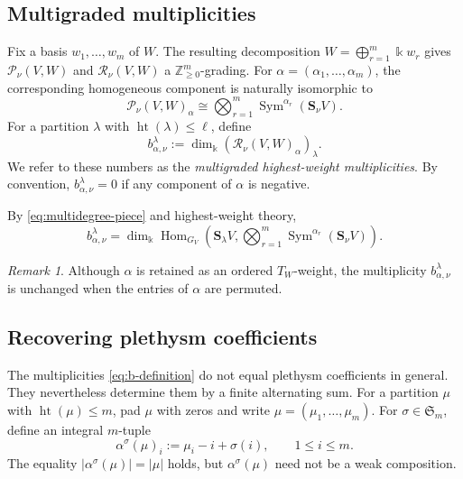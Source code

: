 \documentclass[11pt]{amsart}
\theoremstyle{definition}
\theoremstyle{remark}
\newtheorem{remark}[theorem]{Remark}
\newcommand{\kk}{\Bbbk}
\newcommand{\Sym}{\operatorname{Sym}}
\newcommand{\htp}{\operatorname{ht}}
\newcommand{\cP}{\mathcal P}
\newcommand{\cR}{\mathcal R}
\newcommand{\frakS}{\mathfrak S}
\begin{document}
\subsection{Multigraded multiplicities}

Fix a basis $w_1,\ldots,w_m$ of $W$.  The resulting decomposition
$W=\bigoplus_{r=1}^m\kk w_r$ gives $\cP_\nu(V,W)$ and
$\cR_\nu(V,W)$ a $\mathbb Z_{\geq0}^m$-grading.  For
$\alpha=(\alpha_1,\ldots,\alpha_m)$, the corresponding homogeneous component
is naturally isomorphic to
\begin{equation}
 \cP_\nu(V,W)_\alpha
 \cong
 \bigotimes_{r=1}^m
 \Sym^{\alpha_r}(\mathbf S_\nu V).
 \label{eq:multidegree-piece}
\end{equation}
For a partition $\lambda$ with $\htp(\lambda)\leq\ell$, define
\begin{equation}
 b_{\alpha,\nu}^{\lambda}
 :=
 \dim_\kk
 \left(\cR_\nu(V,W)_\alpha\right)_\lambda.
 \label{eq:b-definition}
\end{equation}
We refer to these numbers as the \emph{multigraded highest-weight
multiplicities}.  By convention, $b_{\alpha,\nu}^{\lambda}=0$ if any component of
$\alpha$ is negative.

By \eqref{eq:multidegree-piece} and highest-weight theory,
\begin{equation}
 b_{\alpha,\nu}^{\lambda}
 =\dim_\kk\operatorname{Hom}_{G_V}\!\left(\mathbf S_\lambda V,
   \bigotimes_{r=1}^m\Sym^{\alpha_r}(\mathbf S_\nu V)\right).
 \label{eq:b-as-multiplicity}
\end{equation}

\begin{remark}
Although $\alpha$ is retained as an ordered $T_W$-weight, the multiplicity
$b_{\alpha,\nu}^{\lambda}$ is unchanged when the entries of $\alpha$ are
permuted.
\end{remark}

\subsection{Recovering plethysm coefficients}

The multiplicities \eqref{eq:b-definition} do not equal plethysm coefficients
in general.  They nevertheless determine them by a finite alternating sum.
For a partition $\mu$ with $\htp(\mu)\leq m$, pad $\mu$ with
zeros and write
$\mu=(\mu_1,\ldots,\mu_m).$
For $\sigma\in\frakS_m$, define an integral $m$-tuple
\begin{equation}
 \alpha^\sigma(\mu)_i
 :=\mu_i-i+\sigma(i),
 \qquad 1\leq i\leq m.
 \label{eq:shifted-composition}
\end{equation}
The equality $|\alpha^\sigma(\mu)|=|\mu|$ holds, but
$\alpha^\sigma(\mu)$ need not be a weak composition.
\end{document}
